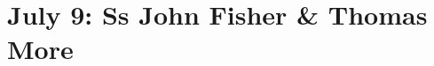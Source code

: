 {
\section{July 9: Ss John Fisher \& Thomas More}
\subtitle{ Class}
\subtitle{I \& II Vespers}
\medskip

\def\deusinadjutoriumsolemn{F}
\def\vrlinebreak{F}
\def\preanttwo{\vspace{-0.5\baselineskip}}
\def\prepsalmthreeverses{\vspace{-0.1\baselineskip}}
\def\prerepeatantiphonthree{}
\def\prepsalmtitlefour{\vspace{-0.3\baselineskip}}
\def\prepsalmtitlefive{\vspace{-0.5\baselineskip}}
\def\begincollectcols{\begin{parcolumns}[rulebetween,colwidths={1=0.44\linewidth}]{2}}
\def\definevesperspropers{%
  
}
\def\definevesperspropersalt{
	
	\def\vrlinebreak{T}
}
\def\vesperspropersnote{At II Vespers:}
\def\vesperspropersaltnote{At I Vespers:}
\def\prevesperspsalms{\noindent\printnote{Chapter and following, page \pageref{july9-chapter}.\\}
  \medskip
  \hrule
  \medskip
}
\def\vesperspsalmslabel{\label{july9-2vespers}}
\def\prevesperspsalmsalt{\noindent\printnote{II Vespers psalms and antiphons, page \pageref{july9-2vespers}.}\medskip}
\def\prechapter{\label{july9-chapter}}

\bigskip
\benedicamusdomino{}
}